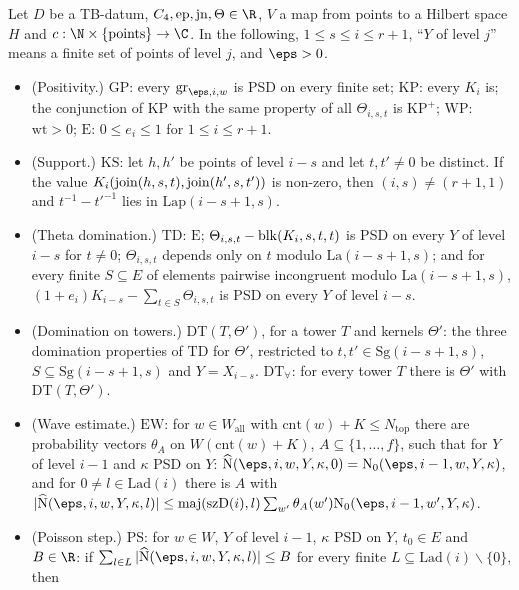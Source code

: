 \begin{definition}\label{pf:thmS:tbhyp}
Let $D$ be a TB-datum, $C_4,\mathrm{ep},\mathrm{jn},\Theta\in\R$, $V$ a map from points to a Hilbert space $H$ and
$c:\N\times\{\text{points}\}\to\C$. In the following, $1\le s\le i\le r+1$, ``$Y$ of level $j$'' means a finite set of
points of level $j$, and $\eps>0$.
\begin{itemize}
\item (Positivity.) $\mathrm{GP}$: every $\thmSgram_{\eps,i,w}$ is PSD on every finite set; $\mathrm{KP}$: every $K_i$ is; the
conjunction of $\mathrm{KP}$ with the same property of all $\Theta_{i,s,t}$ is $\mathrm{KP}^{+}$;
$\mathrm{WP}$: $\mathrm{wt}>0$; $\mathrm{E}$: $0\le e_i\le1$ for $1\le i\le r+1$.
\item (Support.) $\mathrm{KS}$: let $h,h'$ be points of level $i-s$ and let $t,t'\ne0$ be distinct. If the value
$K_i(\operatorname{join}(h,s,t),\operatorname{join}(h',s,t'))$ is non-zero, then $(i,s)\ne(r+1,1)$ and $t^{-1}-t'^{-1}$ lies in
$\mathrm{Lap}(i-s+1,s)$.
\item (Theta domination.) $\mathrm{TD}$: $\mathrm{E}$; $\Theta_{i,s,t}-\operatorname{blk}(K_i,s,t,t)$ is PSD on every $Y$ of level
$i-s$ for $t\ne0$; $\Theta_{i,s,t}$ depends only on $t$ modulo $\mathrm{La}(i-s+1,s)$; and for every finite $S\subseteq E$
of elements pairwise incongruent modulo $\mathrm{La}(i-s+1,s)$, $(1+e_i)K_{i-s}-\sum_{t\in S}\Theta_{i,s,t}$ is PSD on every
$Y$ of level $i-s$.
\item (Domination on towers.) $\mathrm{DT}(T,\Theta')$, for a tower $T$ and kernels $\Theta'$: the three domination properties of
$\mathrm{TD}$ for $\Theta'$, restricted to $t,t'\in\mathrm{Sg}(i-s+1,s)$, $S\subseteq\mathrm{Sg}(i-s+1,s)$ and
$Y=X_{i-s}$. $\mathrm{DT}_{\forall}$: for every tower $T$ there is $\Theta'$ with $\mathrm{DT}(T,\Theta')$.
\item (Wave estimate.) $\mathrm{EW}$: for $w\in W_{\mathrm{all}}$ with $\mathrm{cnt}(w)+K\le N_{\mathrm{top}}$ there are probability
vectors $\theta_A$ on $W(\mathrm{cnt}(w)+K)$, $A\subseteq\{1,\dots,f\}$, such that for $Y$ of level $i-1$ and $\kappa$
PSD on $Y$: $\thmSNh(\eps,i,w,Y,\kappa,0)=\thmSNz(\eps,i-1,w,Y,\kappa)$, and for $0\ne l\in\mathrm{Lad}(i)$ there is $A$
with $|\thmSNh(\eps,i,w,Y,\kappa,l)|\le\thmSmaj(\mathrm{szD}(i),l)\sum_{w'}\theta_A(w')\thmSNz(\eps,i-1,w',Y,\kappa)$.
\item (Poisson step.) $\mathrm{PS}$: for $w\in W$, $Y$ of level $i-1$, $\kappa$ PSD on $Y$, $t_0\in E$ and $B\in\R$: if
$\sum_{l\in L}|\thmSNh(\eps,i,w,Y,\kappa,l)|\le B$ for every finite $L\subseteq\mathrm{Lad}(i)\smallsetminus\{0\}$, then

\end{itemize}
\end{definition}
